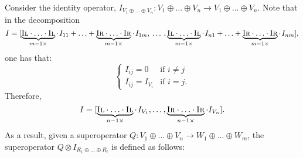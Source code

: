 Consider the identity operator, $I_{V_1 \oplus \ldots \oplus V_n}: V_1 \oplus \ldots \oplus V_n \rightarrow  V_1 \oplus \ldots \oplus V_n$. Note that in the decomposition 
$$I= [ \underbrace{\textsc{Il} \cdot \ldots \cdot \textsc{Il}}_{m-1 \times} \cdot \hspace{1pt} I_{11} + \ldots +   \underbrace{\textsc{Ir} \cdot \ldots \cdot \textsc{Ir}}_{m-1 \times}\cdot \hspace{1pt} I_{1m},  \hspace{2pt} \ldots  \hspace{2pt},  \underbrace{\textsc{Il} \cdot \ldots \cdot \textsc{Il}}_{m-1 \times} \cdot\hspace{1pt} I_{n1} + \ldots + \underbrace{\textsc{Ir} \cdot \ldots \cdot \textsc{Ir}}_{m-1 \times}\cdot \hspace{1pt} I_{nm}],$$
one has that:
\begin{equation*}
  \begin{cases}
    I_{ij} = 0 & \text{if } i \neq j \\
    I_{ij} = I_{V_i} & \text{if } i = j.
  \end{cases}
\end{equation*}
Therefore,
 $$I = [\underbrace{\textsc{Il} \cdot \ldots \cdot \textsc{Il}}_{n-1 \times} \cdot \hspace{1pt}I_{V_1}, \ldots,  \underbrace{\textsc{Ir} \cdot \ldots \cdot \textsc{Ir}}_{n-1 \times} \cdot I_{V_n}].$$ 
 As a result, given a superoperator $Q: V_1 \oplus \ldots \oplus V_n \rightarrow W_1 \oplus \ldots \oplus W_m$, the superoperator $Q \otimes I_{R_1 \oplus \ldots \oplus R_t}$ is defined as follows:

